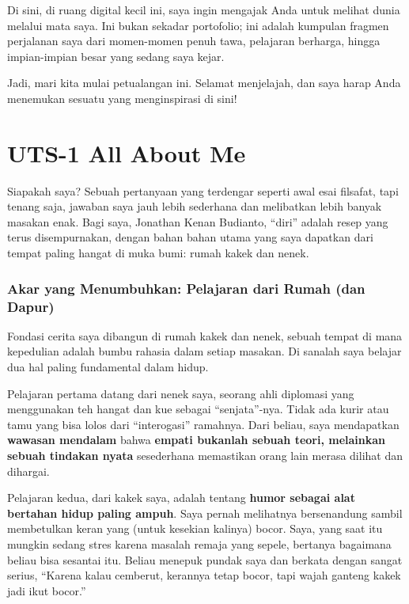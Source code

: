 \documentclass[
  letterpaper,
  DIV=11,
  numbers=noendperiod]{scrreprt}
\begin{document}
Di sini, di ruang digital kecil ini, saya ingin mengajak Anda untuk
melihat dunia melalui mata saya. Ini bukan sekadar portofolio; ini
adalah kumpulan fragmen perjalanan saya dari momen-momen penuh tawa,
pelajaran berharga, hingga impian-impian besar yang sedang saya kejar.

Jadi, mari kita mulai petualangan ini. Selamat menjelajah, dan saya
harap Anda menemukan sesuatu yang menginspirasi di sini!


\chapter{UTS-1 All About Me}\label{uts-1-all-about-me}

Siapakah saya? Sebuah pertanyaan yang terdengar seperti awal esai
filsafat, tapi tenang saja, jawaban saya jauh lebih sederhana dan
melibatkan lebih banyak masakan enak. Bagi saya, Jonathan Kenan
Budianto, ``diri'' adalah resep yang terus disempurnakan, dengan bahan
bahan utama yang saya dapatkan dari tempat paling hangat di muka bumi:
rumah kakek dan nenek.

\subsection{Akar yang Menumbuhkan: Pelajaran dari Rumah (dan
Dapur)}\label{akar-yang-menumbuhkan-pelajaran-dari-rumah-dan-dapur}

Fondasi cerita saya dibangun di rumah kakek dan nenek, sebuah tempat di
mana kepedulian adalah bumbu rahasia dalam setiap masakan. Di sanalah
saya belajar dua hal paling fundamental dalam hidup.

Pelajaran pertama datang dari nenek saya, seorang ahli diplomasi yang
menggunakan teh hangat dan kue sebagai ``senjata''-nya. Tidak ada kurir
atau tamu yang bisa lolos dari ``interogasi'' ramahnya. Dari beliau,
saya mendapatkan \textbf{wawasan mendalam} bahwa \textbf{empati bukanlah
sebuah teori, melainkan sebuah tindakan nyata} sesederhana memastikan
orang lain merasa dilihat dan dihargai.

Pelajaran kedua, dari kakek saya, adalah tentang \textbf{humor sebagai
alat bertahan hidup paling ampuh}. Saya pernah melihatnya bersenandung
sambil membetulkan keran yang (untuk kesekian kalinya) bocor. Saya, yang
saat itu mungkin sedang stres karena masalah remaja yang sepele,
bertanya bagaimana beliau bisa sesantai itu. Beliau menepuk pundak saya
dan berkata dengan sangat serius, ``Karena kalau cemberut, kerannya
tetap bocor, tapi wajah ganteng kakek jadi ikut bocor.''
\end{document}
